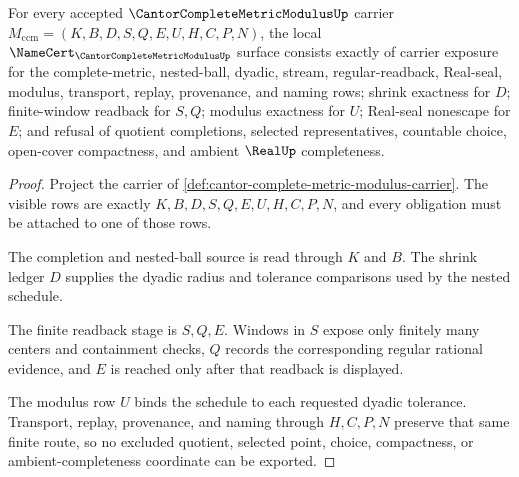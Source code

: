 \begin{theorem}
\label{thm:cantor-complete-metric-modulus-namecert-obligations}
For every accepted $\CantorCompleteMetricModulusUp$ carrier $M_{\mathrm{ccm}}=(K,B,D,S,Q,E,U,H,C,P,N)$, the local $\NameCert_{\CantorCompleteMetricModulusUp}$ surface consists exactly of carrier exposure for the complete-metric, nested-ball, dyadic, stream, regular-readback, Real-seal, modulus, transport, replay, provenance, and naming rows; shrink exactness for $D$; finite-window readback for $S,Q$; modulus exactness for $U$; Real-seal nonescape for $E$; and refusal of quotient completions, selected representatives, countable choice, open-cover compactness, and ambient $\RealUp$ completeness.
\end{theorem}
\begin{proof}
Project the carrier of \autoref{def:cantor-complete-metric-modulus-carrier}. The visible rows are exactly $K,B,D,S,Q,E,U,H,C,P,N$, and every obligation must be attached to one of those rows.

The completion and nested-ball source is read through $K$ and $B$. The shrink ledger $D$ supplies the dyadic radius and tolerance comparisons used by the nested schedule.

The finite readback stage is $S,Q,E$. Windows in $S$ expose only finitely many centers and containment checks, $Q$ records the corresponding regular rational evidence, and $E$ is reached only after that readback is displayed.

The modulus row $U$ binds the schedule to each requested dyadic tolerance. Transport, replay, provenance, and naming through $H,C,P,N$ preserve that same finite route, so no excluded quotient, selected point, choice, compactness, or ambient-completeness coordinate can be exported.
\end{proof}

